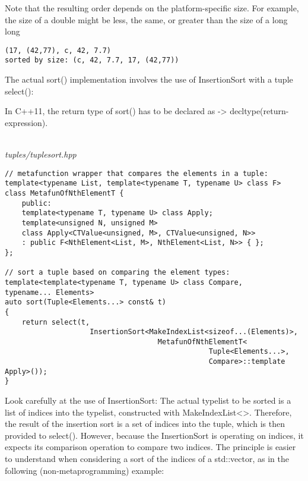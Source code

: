\begin{tcolorbox}[colback=webgreen!5!white,colframe=webgreen!75!black]
\hspace*{0.75cm}Note that the resulting order depends on the platform-specific size. For example, the size of a double might be less, the same, or greater than the size of a long long
\end{tcolorbox}

\begin{lstlisting}[style=styleCXX]
(17, (42,77), c, 42, 7.7)
sorted by size: (c, 42, 7.7, 17, (42,77))
\end{lstlisting}

The actual sort() implementation involves the use of InsertionSort with a tuple select():

\begin{tcolorbox}[colback=webgreen!5!white,colframe=webgreen!75!black]
\hspace*{0.75cm}In C++11, the return type of sort() has to be declared as -> decltype(return-expression).
\end{tcolorbox}

\hspace*{\fill} \\ %
\noindent
\textit{tuples/tuplesort.hpp}
\begin{lstlisting}[style=styleCXX]
// metafunction wrapper that compares the elements in a tuple:
template<typename List, template<typename T, typename U> class F>
class MetafunOfNthElementT {
	public:
	template<typename T, typename U> class Apply;
	template<unsigned N, unsigned M>
	class Apply<CTValue<unsigned, M>, CTValue<unsigned, N>>
	: public F<NthElement<List, M>, NthElement<List, N>> { };
};

// sort a tuple based on comparing the element types:
template<template<typename T, typename U> class Compare,
typename... Elements>
auto sort(Tuple<Elements...> const& t)
{
	return select(t,
					InsertionSort<MakeIndexList<sizeof...(Elements)>,
									MetafunOfNthElementT<
												Tuple<Elements...>,
												Compare>::template Apply>());
}
\end{lstlisting}

Look carefully at the use of InsertionSort: The actual typelist to be sorted is a list of indices into the typelist, constructed with MakeIndexList<>. Therefore, the result of the insertion sort is a set of indices into the tuple, which is then provided to select(). However, because the InsertionSort is operating on indices, it expects its comparison operation to compare two indices. The principle is easier to understand when considering a sort of the indices of a std::vector, as in the following (non-metaprogramming) example:

